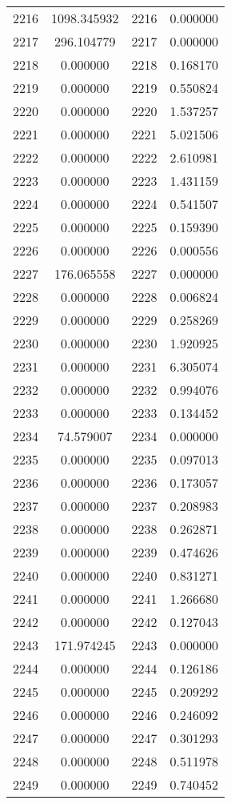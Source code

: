\documentclass[12pt]{article}
\begin{document}
\begin{longtable}{@{}cccc@{}}
2216 & 1098.345932 & 2216 & 0.000000 \\
2217 & 296.104779 & 2217 & 0.000000 \\
2218 & 0.000000 & 2218 & 0.168170 \\
2219 & 0.000000 & 2219 & 0.550824 \\
2220 & 0.000000 & 2220 & 1.537257 \\
2221 & 0.000000 & 2221 & 5.021506 \\
2222 & 0.000000 & 2222 & 2.610981 \\
2223 & 0.000000 & 2223 & 1.431159 \\
2224 & 0.000000 & 2224 & 0.541507 \\
2225 & 0.000000 & 2225 & 0.159390 \\
2226 & 0.000000 & 2226 & 0.000556 \\
2227 & 176.065558 & 2227 & 0.000000 \\
2228 & 0.000000 & 2228 & 0.006824 \\
2229 & 0.000000 & 2229 & 0.258269 \\
2230 & 0.000000 & 2230 & 1.920925 \\
2231 & 0.000000 & 2231 & 6.305074 \\
2232 & 0.000000 & 2232 & 0.994076 \\
2233 & 0.000000 & 2233 & 0.134452 \\
2234 & 74.579007 & 2234 & 0.000000 \\
2235 & 0.000000 & 2235 & 0.097013 \\
2236 & 0.000000 & 2236 & 0.173057 \\
2237 & 0.000000 & 2237 & 0.208983 \\
2238 & 0.000000 & 2238 & 0.262871 \\
2239 & 0.000000 & 2239 & 0.474626 \\
2240 & 0.000000 & 2240 & 0.831271 \\
2241 & 0.000000 & 2241 & 1.266680 \\
2242 & 0.000000 & 2242 & 0.127043 \\
2243 & 171.974245 & 2243 & 0.000000 \\
2244 & 0.000000 & 2244 & 0.126186 \\
2245 & 0.000000 & 2245 & 0.209292 \\
2246 & 0.000000 & 2246 & 0.246092 \\
2247 & 0.000000 & 2247 & 0.301293 \\
2248 & 0.000000 & 2248 & 0.511978 \\
2249 & 0.000000 & 2249 & 0.740452 \\

\end{longtable}
\end{document}
